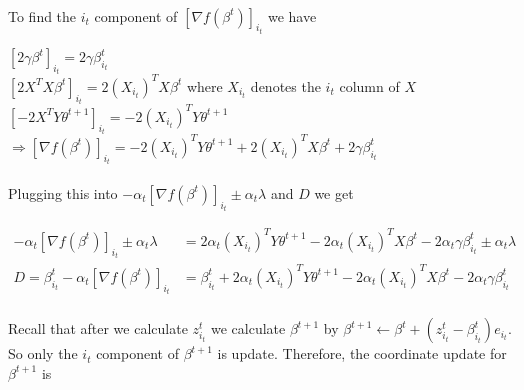 \documentclass[12pt, reqno]{amsart}
\theoremstyle{definition}
\theoremstyle{remark}
\begin{document}
\hfill \\
To find the $i_t$ component of $[\nabla f(\beta^t)]_{i_t}$ we have

$[2 \gamma \beta^t]_{i_t} = 2 \gamma \beta_{i_t}^t$\\

$[2 X^T X \beta^t]_{i_t} = 2 (X_{i_t})^T X \beta^t$ where $X_{i_t}$ denotes the $i_t$ column of $X$\\

$[-2 X^T Y \theta^{t+1}]_{i_t} = -2 (X_{i_t})^T Y \theta^{t+1}$\\

$\Rightarrow [\nabla f(\beta^t)]_{i_t} = -2 (X_{i_t})^T Y \theta^{t+1} + 2 (X_{i_t})^T X \beta^t + 2 \gamma \beta_{i_t}^t$\\

\hfill \\
Plugging this into $-\alpha_t [\nabla f(\beta^t)]_{i_t} \pm \alpha_t \lambda$ and $D$ we get

\begin{equation*}
\begin{split}
-\alpha_t [\nabla f(\beta^t)]_{i_t} \pm \alpha_t \lambda &= 
		2 \alpha_t (X_{i_t})^T Y \theta^{t+1} - 2 \alpha_t (X_{i_t})^T 
		X\beta^t - 2 \alpha_t\gamma\beta_{i_t}^t \pm \alpha_t \lambda\\
D = \beta_{i_t}^t - \alpha_t [\nabla f(\beta^t)]_{i_t} &= 
		\beta_{i_t}^t + 2 \alpha_t (X_{i_t})^T Y \theta^{t+1} 
		- 2 \alpha_t (X_{i_t})^T X \beta^t - 2 \alpha_t\gamma \beta_{i_t}^t			\\
\end{split}
\end{equation*}

Recall that after we calculate $z_{i_t}^t$ we calculate $\beta^{t+1}$ by
$\beta^{t+1} \leftarrow \beta^t + (z_{i_t}^t - \beta_{i_t}^t) e_{i_t}$. So only the $i_t$ component of $\beta^{t+1}$ is update. Therefore, the coordinate update for $\beta^{t+1}$ is 
\end{document}
